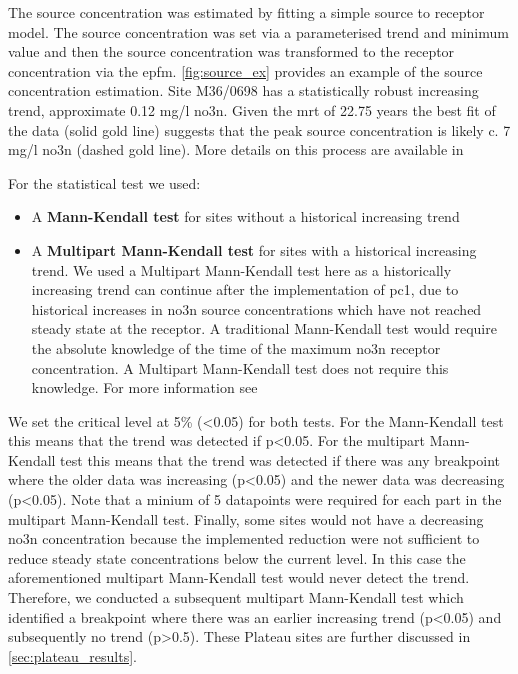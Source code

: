 The source concentration was estimated by fitting a simple source to receptor model. The source concentration was set via a parameterised trend and minimum value and then the source concentration was transformed to the receptor concentration via the \gls{epfm}. \autoref{fig:source_ex} provides an example of the source concentration estimation. Site M36/0698 has a statistically robust increasing trend, approximate 0.12 mg/l \gls{no3n}. Given the \gls{mrt} of 22.75 years the best fit of the data (solid gold line) suggests that the peak source concentration is likely c. 7 mg/l \gls{no3n} (dashed gold line). More details on this process are available in %


For the statistical test we used:
\begin{itemize}
    \item A \textbf{Mann-Kendall test} for sites without a historical increasing trend
    \item A \textbf{Multipart Mann-Kendall test} for sites with a historical increasing trend. We used a Multipart Mann-Kendall test here as a historically increasing trend can continue after the implementation of \gls{pc1}, due to historical increases in \gls{no3n} source concentrations which have not reached steady state at the receptor. A traditional Mann-Kendall test would require the absolute knowledge of the time of the maximum \gls{no3n} receptor concentration. A Multipart Mann-Kendall test does not require this knowledge. For more information see %
\end{itemize}

We set the critical level at 5\% (<0.05) for both tests. For the Mann-Kendall test this means that the trend was detected if p<0.05. For the multipart Mann-Kendall test this means that the trend was detected if there was any breakpoint where the older data was increasing (p<0.05) and the newer data was decreasing (p<0.05). Note that a minium of 5 datapoints were required for each part in the multipart Mann-Kendall test. Finally, some sites would not have a decreasing \gls{no3n} concentration because the implemented reduction were not sufficient to reduce steady state concentrations below the current level. In this case the aforementioned multipart Mann-Kendall test would never detect the trend. Therefore, we conducted a subsequent multipart Mann-Kendall test which identified a breakpoint where there was an earlier increasing trend (p<0.05) and subsequently no trend (p>0.5). These Plateau sites are further discussed in \autoref{sec:plateau_results}.

